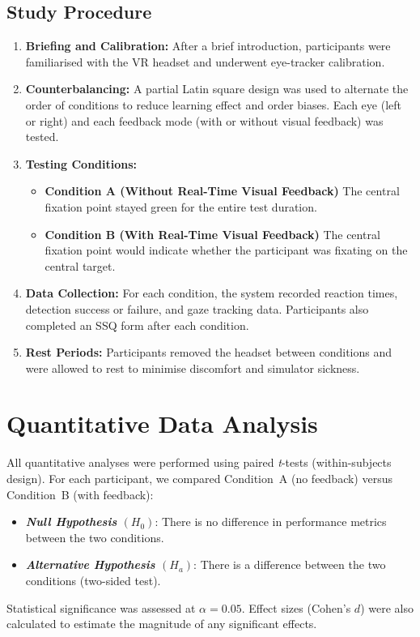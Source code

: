 \documentclass{l4proj}
\begin{document}
\subsection{Study Procedure}
\begin{enumerate}
    \item \textbf{Briefing and Calibration:} After a brief introduction, participants were familiarised with the VR headset and underwent eye-tracker calibration.
    \item \textbf{Counterbalancing:} A partial Latin square design was used to alternate the order of conditions to reduce learning effect and order biases. Each eye (left or right) and each feedback mode (with or without visual feedback) was tested.
    \item \textbf{Testing Conditions:} 
        \begin{itemize}
            \item \textbf{Condition A (Without Real-Time Visual Feedback)} The central fixation point stayed green for the entire test duration.
            \item \textbf{Condition B (With Real-Time Visual Feedback)} The central fixation point would indicate whether the participant was fixating on the central target. 
        \end{itemize}
    \item \textbf{Data Collection:} For each condition, the system recorded reaction times, detection success or failure, and gaze tracking data. Participants also completed an SSQ form after each condition.
    \item \textbf{Rest Periods:} Participants removed the headset between conditions and were allowed to rest to minimise discomfort and simulator sickness.
\end{enumerate}


\section{Quantitative Data Analysis}
All quantitative analyses were performed using paired \emph{t}-tests (within-subjects design). For each participant, we compared Condition~A (no feedback) versus Condition~B (with feedback):
\begin{itemize}
    \item \textbf{\emph{Null Hypothesis} $(H_0)$}: There is no difference in performance metrics between the two conditions.
    \item \textbf{\emph{Alternative Hypothesis} $(H_a)$}: There is a difference between the two conditions (two-sided test).
\end{itemize}
Statistical significance was assessed at $\alpha=0.05$. Effect sizes (Cohen's $d$) were also calculated to estimate the magnitude of any significant effects.
\end{document}
